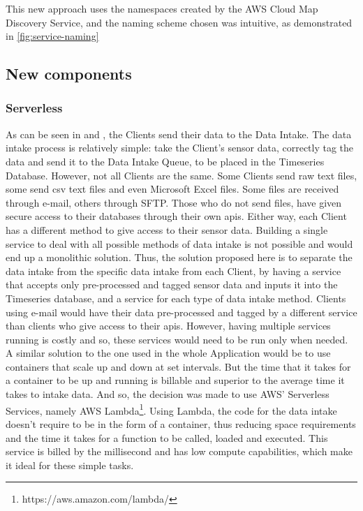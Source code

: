

This new approach uses the namespaces created by the AWS Cloud Map Discovery Service, and the naming scheme chosen was intuitive, as demonstrated in \cref{fig:service-naming}



\subsection{New components}\label{methodology:ss:new-components-new-arch}

\subsubsection{Serverless}\label{methodology:sss:serverless}

As can be seen in  and , the Clients send their data to the Data Intake. The data intake process is relatively simple: take the Client's sensor data, correctly tag the data and send it to the Data Intake Queue, to be placed in the Timeseries Database. 
However, not all Clients are the same. Some Clients send raw text files, some send \gls{csv} text files and even Microsoft Excel files. Some files are received through e-mail, others through SFTP.
Those who do not send files, have given secure access to their databases through their own \glspl{api}.
Either way, each Client has a different method to give access to their sensor data. Building a single service to deal with all possible methods of data intake is not possible and would end up a monolithic solution. Thus, the solution proposed here is to separate the data intake from the specific data intake from each Client, by having a service that accepts only pre-processed and tagged sensor data and inputs it into the Timeseries database, and a service for each type of data intake method. Clients using e-mail would have their data pre-processed and tagged by a different service than clients who give access to their \glspl{api}.
However, having multiple services running is costly and so, these services would need to be run only when needed. A similar solution to the one used in the whole Application would be to use containers that scale up and down at set intervals. But the time that it takes for a container to be up and running is billable and superior to the average time it takes to intake data. And so, the decision was made to use AWS' Serverless Services, namely AWS Lambda\footnote{https://aws.amazon.com/lambda/\label{foot:lambda}}. Using Lambda, the code for the data intake doesn't require to be in the form of a container, thus reducing space requirements and the time it takes for a function to be called, loaded and executed. This service is billed by the millisecond and has low compute capabilities, which make it ideal for these simple tasks.

